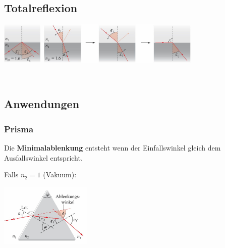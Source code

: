 \subsection{Totalreflexion}

\begin{center}
	\begin{minipage}{0.1\textwidth}
	\end{minipage}%
	\begin{minipage}{0.5\textwidth}
		\includegraphics[height=2cm,keepaspectratio=true]{Images/totalreflexion.png}
		\includegraphics[height=2cm,keepaspectratio=true]{Images/einfallswinkel.png}
	\end{minipage}
\end{center}

 \\




\subsection{Anwendungen}
\subsubsection{Prisma}

Die \textbf{Minimalablenkung} entsteht wenn der Einfallswinkel gleich dem Ausfallswinkel entspricht.

\begin{center}
	\begin{minipage}{0.3\textwidth}
	
		Falls $ n_2 = 1 $ (Vakuum):
	\end{minipage}%
	\begin{minipage}{0.3\textwidth}
		\includegraphics[height=3cm,keepaspectratio=true]{Images/prisma.png}
	\end{minipage}
\end{center}


